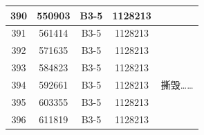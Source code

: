 \documentclass[UTF8,10pt,a4paper,fontset=fandol]{ctexart}
\newcommand{\fieldvalue}[1]{#1}
\newcommand{\handwritten}[1]{#1}
\begin{document}
\begin{center}
\begin{tabular}{|c|c|c|c|c|}
\fieldvalue{390} &
\fieldvalue{550903} &
\fieldvalue{B3-5} &
\fieldvalue{1128213} & \\ \hline

\fieldvalue{391} &
\fieldvalue{561414} &
\fieldvalue{B3-5} &
\fieldvalue{1128213} & \\ \hline

\fieldvalue{392} &
\fieldvalue{571635} &
\fieldvalue{B3-5} &
\fieldvalue{1128213} & \\ \hline

\fieldvalue{393} &
\fieldvalue{584823} &
\fieldvalue{B3-5} &
\fieldvalue{1128213} & \\ \hline

\fieldvalue{394} &
\fieldvalue{592661} &
\fieldvalue{B3-5} &
\fieldvalue{1128213} &
\handwritten{撕毁……}
\\ \hline

\fieldvalue{395} &
\fieldvalue{603355} &
\fieldvalue{B3-5} &
\fieldvalue{1128213} & \\ \hline

\fieldvalue{396} &
\fieldvalue{611819} &
\fieldvalue{B3-5} &
\fieldvalue{1128213} & \\ \hline


\end{tabular}
\end{center}
\end{document}

